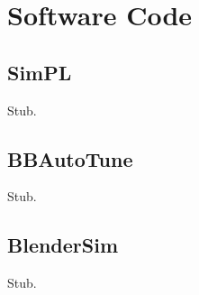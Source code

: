\chapter{Software Code}

\label{AppendixA} %

\section{SimPL}

Stub.

\section{BBAutoTune}

Stub.

\section{BlenderSim}

Stub.
